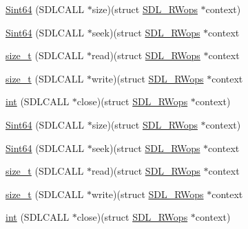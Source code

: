 \begin{DoxyCompactItemize}
\item 
\hyperlink{structSDL__RWops_a45f66dbb683a88281d96f83ca18c525f}{Sint64} (S\+D\+L\+C\+A\+L\+L $\ast$size)(struct \hyperlink{structSDL__RWops}{S\+D\+L\+\_\+\+R\+Wops} $\ast$context)
\item 
\hyperlink{structSDL__RWops_a767114391a3d1b4a7c214da3e164acf5}{Sint64} (S\+D\+L\+C\+A\+L\+L $\ast$seek)(struct \hyperlink{structSDL__RWops}{S\+D\+L\+\_\+\+R\+Wops} $\ast$context
\item 
\hyperlink{structSDL__RWops_acd9a3c6e840d285c1e30cadaf99097b2}{size\+\_\+t} (S\+D\+L\+C\+A\+L\+L $\ast$read)(struct \hyperlink{structSDL__RWops}{S\+D\+L\+\_\+\+R\+Wops} $\ast$context
\item 
\hyperlink{structSDL__RWops_a5f12fd517afffba5bfaff4643d6792b1}{size\+\_\+t} (S\+D\+L\+C\+A\+L\+L $\ast$write)(struct \hyperlink{structSDL__RWops}{S\+D\+L\+\_\+\+R\+Wops} $\ast$context
\item 
\hyperlink{structSDL__RWops_ab303bcbb0f6742a141ba8b2998923f47}{int} (S\+D\+L\+C\+A\+L\+L $\ast$close)(struct \hyperlink{structSDL__RWops}{S\+D\+L\+\_\+\+R\+Wops} $\ast$context)
\item 
\hyperlink{structSDL__RWops_a45f66dbb683a88281d96f83ca18c525f}{Sint64} (S\+D\+L\+C\+A\+L\+L $\ast$size)(struct \hyperlink{structSDL__RWops}{S\+D\+L\+\_\+\+R\+Wops} $\ast$context)
\item 
\hyperlink{structSDL__RWops_a767114391a3d1b4a7c214da3e164acf5}{Sint64} (S\+D\+L\+C\+A\+L\+L $\ast$seek)(struct \hyperlink{structSDL__RWops}{S\+D\+L\+\_\+\+R\+Wops} $\ast$context
\item 
\hyperlink{structSDL__RWops_acd9a3c6e840d285c1e30cadaf99097b2}{size\+\_\+t} (S\+D\+L\+C\+A\+L\+L $\ast$read)(struct \hyperlink{structSDL__RWops}{S\+D\+L\+\_\+\+R\+Wops} $\ast$context
\item 
\hyperlink{structSDL__RWops_a5f12fd517afffba5bfaff4643d6792b1}{size\+\_\+t} (S\+D\+L\+C\+A\+L\+L $\ast$write)(struct \hyperlink{structSDL__RWops}{S\+D\+L\+\_\+\+R\+Wops} $\ast$context
\item 
\hyperlink{structSDL__RWops_ab303bcbb0f6742a141ba8b2998923f47}{int} (S\+D\+L\+C\+A\+L\+L $\ast$close)(struct \hyperlink{structSDL__RWops}{S\+D\+L\+\_\+\+R\+Wops} $\ast$context)
\end{DoxyCompactItemize}

